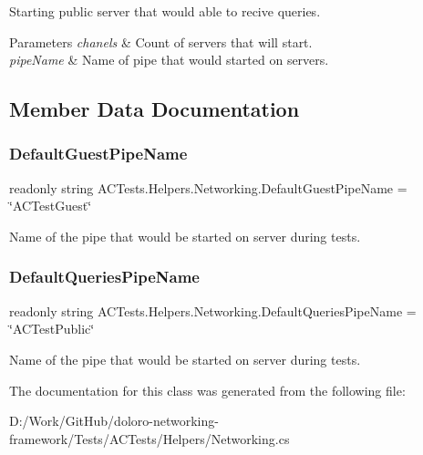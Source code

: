 Starting public server that would able to recive queries. 


\begin{DoxyParams}{Parameters}
{\em chanels} & Count of servers that will start.\\
\hline
{\em pipe\+Name} & Name of pipe that would started on servers.\\
\hline
\end{DoxyParams}


\subsection{Member Data Documentation}
\mbox{\label{class_a_c_tests_1_1_helpers_1_1_networking_a93b4700cffc19dd3ca204e1fa3890028}} 
\subsubsection{\texorpdfstring{Default\+Guest\+Pipe\+Name}{DefaultGuestPipeName}}
{\footnotesize\ttfamily readonly string A\+C\+Tests.\+Helpers.\+Networking.\+Default\+Guest\+Pipe\+Name = \char`\"{}A\+C\+Test\+Guest\char`\"{}\hspace{0.3cm}{\ttfamily [static]}}



Name of the pipe that would be started on server during tests. 

\mbox{\label{class_a_c_tests_1_1_helpers_1_1_networking_a0b045b1439744a08d2c9fd8f78988007}} 
\subsubsection{\texorpdfstring{Default\+Queries\+Pipe\+Name}{DefaultQueriesPipeName}}
{\footnotesize\ttfamily readonly string A\+C\+Tests.\+Helpers.\+Networking.\+Default\+Queries\+Pipe\+Name = \char`\"{}A\+C\+Test\+Public\char`\"{}\hspace{0.3cm}{\ttfamily [static]}}



Name of the pipe that would be started on server during tests. 



The documentation for this class was generated from the following file\+:\begin{DoxyCompactItemize}
\item 
D\+:/\+Work/\+Git\+Hub/doloro-\/networking-\/framework/\+Tests/\+A\+C\+Tests/\+Helpers/Networking.\+cs\end{DoxyCompactItemize}
